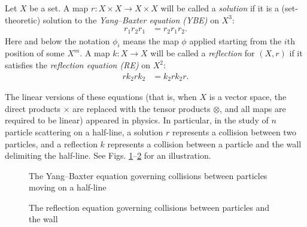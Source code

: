 \documentclass{amsart}
\theoremstyle{plain}
\theoremstyle{definition}
\theoremstyle{remark}
\begin{document}
Let $X$ be a set. A map $r \colon X \times X \to X \times X$ will be called a \emph{solution} if it is a (set-theoretic) solution to the \emph{Yang--Baxter equation (YBE)} on $X^3$:
\begin{align}
r_1r_2r_1 &=r_2r_1r_2. \label{E:YBE}
\end{align}
Here and below the notation $\phi_i$ means the map $\phi$ applied starting from the $i$th position of some $X^{m}$. A map $k \colon X \to X$ will be called a \emph{reflection} for $(X,r)$ if it satisfies the \emph{reflection equation (RE)} on $X^2$:
\begin{align}
rk_2rk_2 &= k_2rk_2r. \label{E:RE}
\end{align}

The linear versions of these equations (that is, when $X$ is a vector space, the direct products $\times$ are replaced with the tensor products $\otimes$, and all maps are required to be linear) appeared in physics. In particular, in the study of $n$ particle scattering on a half-line, a solution $r$ represents a collision between two particles, and a reflection $k$ represents a collision between a particle and the wall delimiting the half-line. See Figs. \ref{P:Scattering}--\ref{P:Scattering2} for an illustration.

\begin{figure}[h]
\centering
{}
\caption{The Yang--Baxter equation governing collisions between particles moving on a half-line}\label{P:Scattering}
\end{figure}

\begin{figure}[h]
\centering
{}
\caption{The reflection equation governing collisions between particles and the wall}\label{P:Scattering2}
\end{figure}
\end{document}

